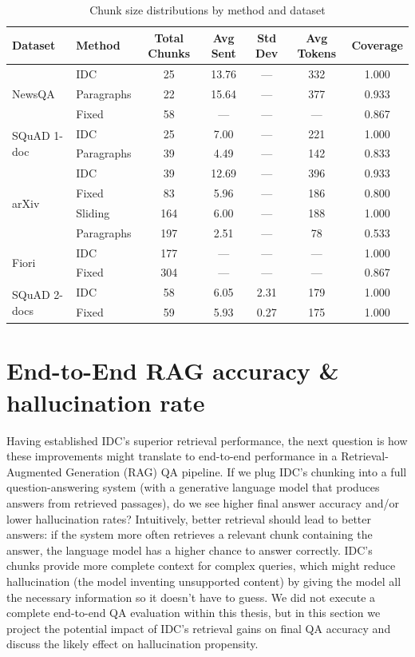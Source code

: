 \documentclass[12pt,a4paper]{report}
\begin{document}
\begin{table}[h!]
\centering
\caption{Chunk size distributions by method and dataset}
\label{tab:chunk_size_distributions}
\scriptsize
\begin{tabular}{llccccc}
\hline
\textbf{Dataset} & \textbf{Method} & \textbf{Total Chunks} & \textbf{Avg Sent} & \textbf{Std Dev} & \textbf{Avg Tokens} & \textbf{Coverage} \\
\hline
\multirow{3}{*}{NewsQA} & IDC & 25 & 13.76 & --- & 332 & 1.000 \\
& Paragraphs & 22 & 15.64 & --- & 377 & 0.933 \\
& Fixed & 58 & --- & --- & --- & 0.867 \\
\hline
\multirow{2}{*}{SQuAD 1-doc} & IDC & 25 & 7.00 & --- & 221 & 1.000 \\
& Paragraphs & 39 & 4.49 & --- & 142 & 0.833 \\
\hline
\multirow{4}{*}{arXiv} & IDC & 39 & 12.69 & --- & 396 & 0.933 \\
& Fixed & 83 & 5.96 & --- & 186 & 0.800 \\
& Sliding & 164 & 6.00 & --- & 188 & 1.000 \\
& Paragraphs & 197 & 2.51 & --- & 78 & 0.533 \\
\hline
\multirow{2}{*}{Fiori} & IDC & 177 & --- & --- & --- & 1.000 \\
& Fixed & 304 & --- & --- & --- & 0.867 \\
\hline
\multirow{2}{*}{SQuAD 2-docs} & IDC & 58 & 6.05 & 2.31 & 179 & 1.000 \\
& Fixed & 59 & 5.93 & 0.27 & 175 & 1.000 \\
\hline
\end{tabular}
\end{table}

\section{End-to-End RAG accuracy \& hallucination rate}\label{sec:rag-accuracy}

Having established IDC's superior retrieval performance, the next question is how these improvements might translate to end-to-end performance in a Retrieval-Augmented Generation (RAG) QA pipeline. If we plug IDC's chunking into a full question-answering system (with a generative language model that produces answers from retrieved passages), do we see higher final answer accuracy and/or lower hallucination rates? Intuitively, better retrieval should lead to better answers: if the system more often retrieves a relevant chunk containing the answer, the language model has a higher chance to answer correctly. IDC's chunks provide more complete context for complex queries, which might reduce hallucination (the model inventing unsupported content) by giving the model all the necessary information so it doesn't have to guess. We did not execute a complete end-to-end QA evaluation within this thesis, but in this section we project the potential impact of IDC's retrieval gains on final QA accuracy and discuss the likely effect on hallucination propensity.
\end{document}
